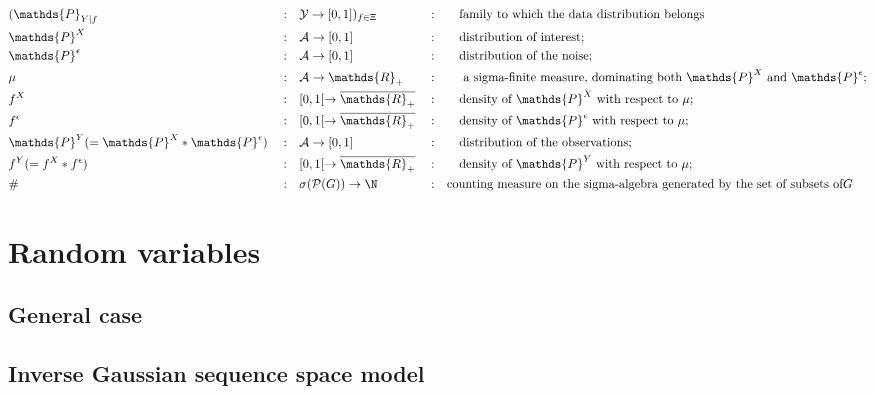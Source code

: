 \begin{alignat*}{5}
& (\mathds{P}_{Y \vert f} &&:&& \mathcal{Y} \rightarrow [0,1])_{f \in \Xi} &&:&& \quad \text{family to which the data distribution belongs}\\
& \mathds{P}^{X} &&:&& \mathcal{A} \rightarrow [0,1] &&: && \quad \text{distribution of interest};\\
& \mathds{P}^{\epsilon}&&:&& \mathcal{A} \rightarrow [0,1] &&: && \quad \text{distribution of the noise};\\
& \mu&&:&& \mathcal{A} \rightarrow \mathds{R}_{+} &&: && \quad \text{ a sigma-finite measure, dominating both } \mathds{P}^{X} \text{ and } \mathds{P}^{\epsilon};\\
& f^{X}&&:&& [0, 1[ \rightarrow \overline{\mathds{R}_{+}} &&: && \quad \text{density of } \mathds{P}^{X} \text{ with respect to } \mu;\\
& f^{\epsilon}&&:&& [0, 1[ \rightarrow \overline{\mathds{R}_{+}} &&: && \quad \text{density of } \mathds{P}^{\epsilon} \text{ with respect to } \mu;\\
& \mathds{P}^{Y} (=\mathds{P}^{X}*\mathds{P}^{\epsilon})&&:&& \mathcal{A} \rightarrow [0,1] &&: && \quad \text{distribution of the observations};\\
& f^{Y}(=f^{X}*f^{\epsilon})&&:&& [0, 1[ \rightarrow \overline{\mathds{R}_{+}} &&: && \quad \text{density of } \mathds{P}^{Y} \text{ with respect to } \mu;\\
& \# && : && \sigma(\mathcal{P}(G)) \rightarrow \N && : && \text{counting measure on the sigma-algebra generated by the set of subsets of} G
\end{alignat*}


\section*{Random variables}
\subsection*{General case}
\subsection*{Inverse Gaussian sequence space model}
